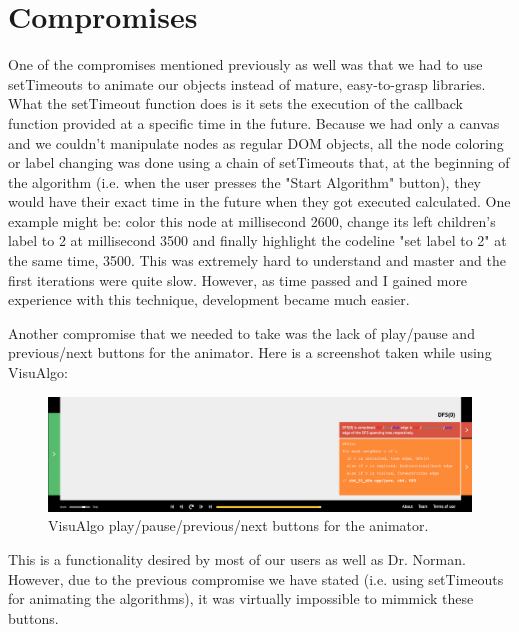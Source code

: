 \documentclass{l4proj}
\begin{document}
\section{Compromises}

One of the compromises mentioned previously as well was that we had to use setTimeouts to animate our objects instead
of mature, easy-to-grasp libraries. What the setTimeout function does is it sets the execution of the callback function
provided at a specific time in the future. Because we had only a canvas and we couldn't manipulate nodes as regular DOM
objects, all the node coloring or label changing was done using a chain of setTimeouts that, at the beginning of the
algorithm (i.e. when the user presses the "Start Algorithm" button), they would have their exact time in the future
when they got executed calculated. One example might be: color this node at millisecond 2600, change its left
children's label to 2 at millisecond 3500 and finally highlight the codeline "set label to 2" at the same time, 3500.
This was extremely hard to understand and master and the first iterations were quite slow. However, as time passed and
I gained more experience with this technique, development became much easier.

Another compromise that we needed to take was the lack of play/pause and previous/next buttons for the animator. Here
is a screenshot taken while using VisuAlgo:

\begin{figure}[!ht]
    \centering
    \includegraphics[scale=0.35]{play-pause-previous-next}
    \caption{VisuAlgo play/pause/previous/next buttons for the animator.}
    \label{fig:play-pause-previous-next}
\end{figure}

This is a functionality desired by most of our users as well as Dr. Norman. However, due to the previous compromise we
have stated (i.e. using setTimeouts for animating the algorithms), it was virtually impossible to mimmick these
buttons.

\end{document}
